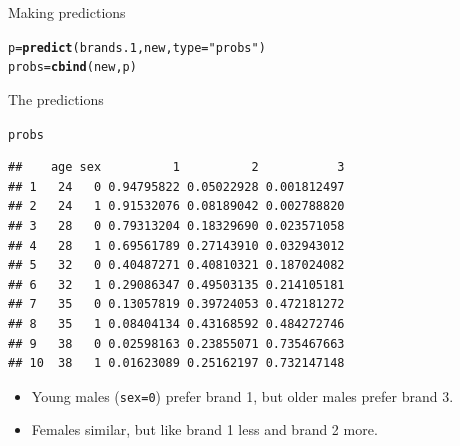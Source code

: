 \documentclass[unknownkeysallowed]{beamer}\usepackage[]{graphicx}\usepackage[]{color}
\makeatletter
\newcommand{\hlstr}[1]{\textcolor[rgb]{0.192,0.494,0.8}{#1}}%
\newcommand{\hlstd}[1]{\textcolor[rgb]{0.345,0.345,0.345}{#1}}%
\newcommand{\hlkwb}[1]{\textcolor[rgb]{0.69,0.353,0.396}{#1}}%
\newcommand{\hlkwc}[1]{\textcolor[rgb]{0.333,0.667,0.333}{#1}}%
\newcommand{\hlkwd}[1]{\textcolor[rgb]{0.737,0.353,0.396}{\textbf{#1}}}%
\newenvironment{kframe}{%
 \def\at@end@of@kframe{}%
 \ifinner\ifhmode%
  \def\at@end@of@kframe{\end{minipage}}%
  \begin{minipage}{\columnwidth}%
 \fi\fi%
 \def\FrameCommand##1{\hskip\@totalleftmargin \hskip-\fboxsep
 \colorbox{shadecolor}{##1}\hskip-\fboxsep
     \hskip-\linewidth \hskip-\@totalleftmargin \hskip\columnwidth}%
 \MakeFramed {\advance\hsize-\width
   \@totalleftmargin\z@ \linewidth\hsize
   \@setminipage}}%
 {\par\unskip\endMakeFramed%
 \at@end@of@kframe}
\newenvironment{knitrout}{}{} %
\makeatother
\begin{document}
\begin{frame}[fragile]{Making predictions}
  
\begin{knitrout}
\color{fgcolor}\begin{kframe}
\begin{alltt}
\hlstd{p}\hlkwb{=}\hlkwd{predict}\hlstd{(brands.1,new,}\hlkwc{type}\hlstd{=}\hlstr{"probs"}\hlstd{)}
\hlstd{probs}\hlkwb{=}\hlkwd{cbind}\hlstd{(new,p)}
\end{alltt}
\end{kframe}
\end{knitrout}
  
\end{frame}

\begin{frame}[fragile]{The predictions}

\begin{knitrout}
\color{fgcolor}\begin{kframe}
\begin{alltt}
\hlstd{probs}
\end{alltt}
\begin{verbatim}
##    age sex          1          2           3
## 1   24   0 0.94795822 0.05022928 0.001812497
## 2   24   1 0.91532076 0.08189042 0.002788820
## 3   28   0 0.79313204 0.18329690 0.023571058
## 4   28   1 0.69561789 0.27143910 0.032943012
## 5   32   0 0.40487271 0.40810321 0.187024082
## 6   32   1 0.29086347 0.49503135 0.214105181
## 7   35   0 0.13057819 0.39724053 0.472181272
## 8   35   1 0.08404134 0.43168592 0.484272746
## 9   38   0 0.02598163 0.23855071 0.735467663
## 10  38   1 0.01623089 0.25162197 0.732147148
\end{verbatim}
\end{kframe}
\end{knitrout}
  
  \begin{itemize}
\item Young males (\texttt{sex=0}) prefer brand 1, 
but older males prefer brand 3.
\item Females similar, but like brand 1 less and
  brand 2 more.
  \end{itemize}
  
\end{frame}
\end{document}
